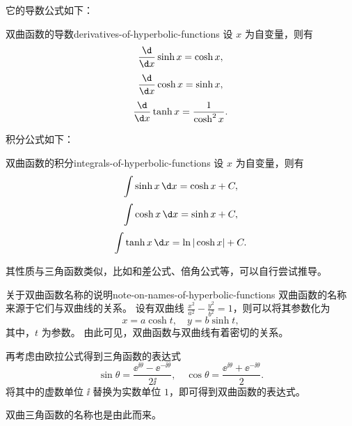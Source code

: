 它的导数公式如下：
\begin{physlist}{双曲函数的导数}{derivatives-of-hyperbolic-functions}
    设 $ x $ 为自变量，则有
    \begin{equation}
        \frac{\d}{\d x} \sinh x = \cosh x ,
    \end{equation}
    \begin{equation}
        \frac{\d}{\d x} \cosh x = \sinh x ,
    \end{equation}
    \begin{equation}
        \frac{\d}{\d x} \tanh x = \frac{1}{\cosh^2 x} .
    \end{equation}

\end{physlist}

积分公式如下：
\begin{physlist}{双曲函数的积分}{integrals-of-hyperbolic-functions}
    设 $ x $ 为自变量，则有
    \begin{equation}
        \int \sinh x \, \d x = \cosh x + C ,
    \end{equation}
    \begin{equation}
        \int \cosh x \, \d x = \sinh x + C ,
    \end{equation}
    \begin{equation}
        \int \tanh x \, \d x = \ln |\cosh x| + C .
    \end{equation}

\end{physlist}

其性质与三角函数类似，比如和差公式、倍角公式等，可以自行尝试推导。

\begin{note}{关于双曲函数名称的说明}{note-on-names-of-hyperbolic-functions}
    双曲函数的名称来源于它们与双曲线的关系。
    设有双曲线 $ \frac{x^2}{a^2} - \frac{y^2}{b^2} = 1 $，则可以将其参数化为
    \begin{equation}
        x = a \cosh t , \quad y = b \sinh t ,
    \end{equation}
    其中，$ t $ 为参数。
    由此可见，双曲函数与双曲线有着密切的关系。

    再考虑由欧拉公式得到三角函数的表达式
    \begin{equation}
        \sin \theta = \frac{\ee^{\ii \theta} - \ee^{-\ii \theta}}{2 \ii} , \quad \cos \theta = \frac{\ee^{\ii \theta} + \ee^{-\ii \theta}}{2} .
    \end{equation}
    将其中的虚数单位 $ \ii $ 替换为实数单位 $ 1 $，即可得到双曲函数的表达式。

    双曲三角函数的名称也是由此而来。
\end{note}
